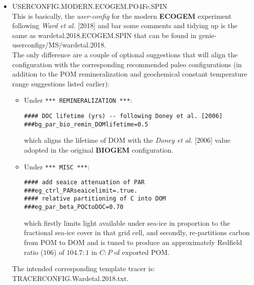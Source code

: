 \begin{itemize}[noitemsep]
\vspace{2mm}
\item \textsf{\small USERCONFIG.MODERN.ECOGEM.PO4Fe.SPIN}
\vspace{1mm}
\\This is basically, the \textit{user-config} for the modern \textbf{ECOGEM} experiment following \textit{Ward et al.} [2018] and bar some comments and tidying up is the same as \textsf{\footnotesize wardetal.2018.ECOGEM.SPIN} that can be found in \textsf{\footnotesize genie-userconfigs/MS/wardetal.2018}.
\\The only difference are a couple of optional suggestions that will align the configuration with the corresponding recommended paleo configurations (in addition to the POM remineralization and geochemical constant temperature range suggestions listed earlier):
\vspace{1mm}
\begin{itemize}[noitemsep]
\item Under \texttt{*** REMINERALIZATION ***}:
\small\vspace{-1mm}\begin{verbatim}
#### DOC lifetime (yrs) -- following Doney et al. [2006]
###bg_par_bio_remin_DOMlifetime=0.5
\end{verbatim}\vspace{-1mm}\normalsize
which aligns the lifetime of DOM with the \textit{Doney et al.} [2006] value adopted in the original \textbf{BIOGEM} configuration.
\vspace{1mm}
\item Under \texttt{*** MISC ***}:
\small\vspace{-1mm}\begin{verbatim}
#### add seaice attenuation of PAR
###eg_ctrl_PARseaicelimit=.true.
#### relative partitioning of C into DOM
###eg_par_beta_POCtoDOC=0.70
\end{verbatim}\vspace{-1mm}\normalsize
which firstly limits light available under sea-ice in proportion to the fractional sea-ice cover in that grid cell, and secondly, re-partitions carbon from POM to DOM and is tuned to produce an approximately Redfield ratio (\(106\)) of \(104.7:1\) in \(C:P\) of exported POM.
\end{itemize}
The intended corresponding template tracer is: \textsf{\footnotesize TRACERCONFIG.Wardetal.2018.txt}.


\end{itemize}
